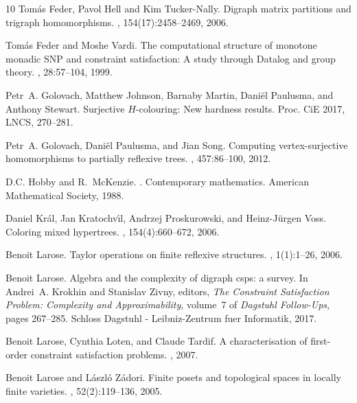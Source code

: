 \documentclass[a4paper,12pt]{article}
\theoremstyle{remark}
\begin{document}
\begin{thebibliography}{10}
Tom{\'{a}}s Feder, Pavol Hell and Kim Tucker{-}Nally.
\newblock Digraph matrix partitions and trigraph homomorphisms.
, 154(17):2458--2469, 2006.

Tom\'as Feder and Moshe Vardi.
\newblock The computational structure of monotone monadic {SNP} and constraint
  satisfaction: {A} study through {D}atalog and group theory.
, 28:57--104, 1999.

Petr~A. Golovach, Matthew Johnson, Barnaby Martin, Dani{\"{e}}l Paulusma, and
  Anthony Stewart.
\newblock Surjective ${H}$-colouring: New hardness results.
\newblock Proc. CiE 2017, LNCS, 270--281.

Petr~A. Golovach, Dani{\"{e}}l Paulusma, and Jian Song.
\newblock Computing vertex-surjective homomorphisms to partially reflexive
  trees.
, 457:86--100, 2012.


D.C. Hobby and R.~McKenzie.
.
\newblock Contemporary mathematics. American Mathematical Society, 1988.

Daniel Kr{\'a}l, Jan Kratochv\'{\i}l, Andrzej Proskurowski, and
  Heinz-J{\"u}rgen Voss.
\newblock Coloring mixed hypertrees.
, 154(4):660--672, 2006.

Benoit Larose.
\newblock Taylor operations on finite reflexive structures.
,
  1(1):1--26, 2006.

Benoit Larose.
\newblock Algebra and the complexity of digraph csps: a survey.
\newblock In Andrei~A. Krokhin and Stanislav Zivny, editors, {\em The
  Constraint Satisfaction Problem: Complexity and Approximability}, volume~7 of
  {\em Dagstuhl Follow-Ups}, pages 267--285. Schloss Dagstuhl - Leibniz-Zentrum
  fuer Informatik, 2017.

Benoit Larose, Cynthia Loten, and Claude Tardif.
\newblock A characterisation of first-order constraint satisfaction problems.
,
  2007.

Benoit Larose and L{\'a}szl{\'o} Z{\'a}dori.
\newblock Finite posets and topological spaces in locally finite varieties.
, 52(2):119--136, 2005.


\end{thebibliography}
\end{document}
